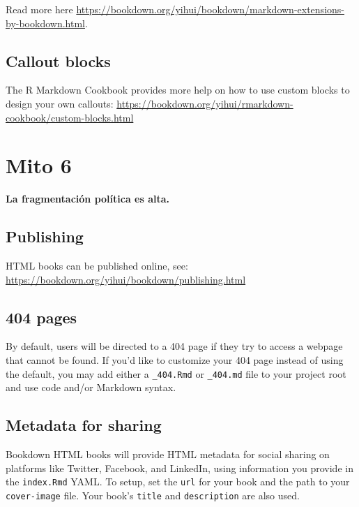 \documentclass[
]{book}
\theoremstyle{definition}
\theoremstyle{definition}
\theoremstyle{definition}
\theoremstyle{definition}
\theoremstyle{remark}
\begin{document}
Read more here \url{https://bookdown.org/yihui/bookdown/markdown-extensions-by-bookdown.html}.

\hypertarget{callout-blocks}{%
\section{Callout blocks}\label{callout-blocks}}

The R Markdown Cookbook provides more help on how to use custom blocks to design your own callouts: \url{https://bookdown.org/yihui/rmarkdown-cookbook/custom-blocks.html}

\hypertarget{mito-6}{%
\chapter{Mito 6}\label{mito-6}}

\textbf{La fragmentación política es alta.}

\hypertarget{publishing}{%
\section{Publishing}\label{publishing}}

HTML books can be published online, see: \url{https://bookdown.org/yihui/bookdown/publishing.html}

\hypertarget{pages}{%
\section{404 pages}\label{pages}}

By default, users will be directed to a 404 page if they try to access a webpage that cannot be found. If you'd like to customize your 404 page instead of using the default, you may add either a \texttt{\_404.Rmd} or \texttt{\_404.md} file to your project root and use code and/or Markdown syntax.

\hypertarget{metadata-for-sharing}{%
\section{Metadata for sharing}\label{metadata-for-sharing}}

Bookdown HTML books will provide HTML metadata for social sharing on platforms like Twitter, Facebook, and LinkedIn, using information you provide in the \texttt{index.Rmd} YAML. To setup, set the \texttt{url} for your book and the path to your \texttt{cover-image} file. Your book's \texttt{title} and \texttt{description} are also used.
\end{document}
